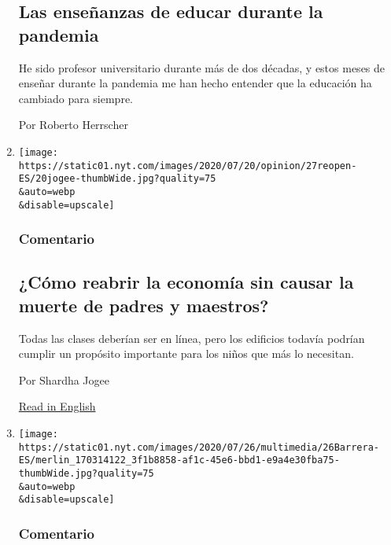 \begin{enumerate}
{  \subsection{Las enseñanzas de educar durante la
  pandemia}\label{las-enseuxf1anzas-de-educar-durante-la-pandemia}}

  He sido profesor universitario durante más de dos décadas, y estos
  meses de enseñar durante la pandemia me han hecho entender que la
  educación ha cambiado para siempre.

  Por Roberto Herrscher
\item
  \href{/es/2020/07/27/espanol/opinion/reabrir-escuelas-riesgo-covid.html}{}

  \texttt{[image: https://static01.nyt.com/images/2020/07/20/opinion/27reopen-ES/20jogee-thumbWide.jpg?quality=75\\\&auto=webp\\\&disable=upscale]}

  \hypertarget{comentario-11}{%
  \subsubsection{Comentario}\label{comentario-11}}

  \hypertarget{cuxf3mo-reabrir-la-economuxeda-sin-causar-la-muerte-de-padres-y-maestros}{%
  \subsection{¿Cómo reabrir la economía sin causar la muerte de padres y
  maestros?}\label{cuxf3mo-reabrir-la-economuxeda-sin-causar-la-muerte-de-padres-y-maestros}}

  Todas las clases deberían ser en línea, pero los edificios todavía
  podrían cumplir un propósito importante para los niños que más lo
  necesitan.

  Por Shardha Jogee

  \href{https://www.nytimes.com/2020/07/20/opinion/coronavirus-reopen-schools-economy.html}{Read
  in English}
\item
  \href{/es/2020/07/26/espanol/opinion/nicmer-evans-venezuela.html}{}

  \texttt{[image: https://static01.nyt.com/images/2020/07/26/multimedia/26Barrera-ES/merlin\_170314122\_3f1b8858-af1c-45e6-bbd1-e9a4e30fba75-thumbWide.jpg?quality=75\\\&auto=webp\\\&disable=upscale]}

  \hypertarget{comentario-12}{%
  \subsubsection{Comentario}\label{comentario-12}}


\end{enumerate}
